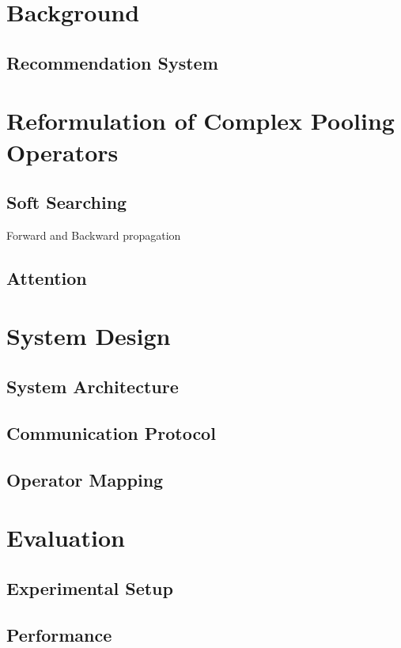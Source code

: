 \documentclass[conference]{IEEEtran}
\begin{document}
\section{Background}
\subsection{Recommendation System}


\subsection{}


\section{Reformulation of Complex Pooling Operators}
\subsection{Soft Searching}
Forward and Backward propagation

\subsection{Attention}


\section{System Design}
\subsection{System Architecture}
\subsection{Communication Protocol}
\subsection{Operator Mapping}



\section{Evaluation}
\subsection{Experimental Setup}
\subsection{Performance}
\end{document}
